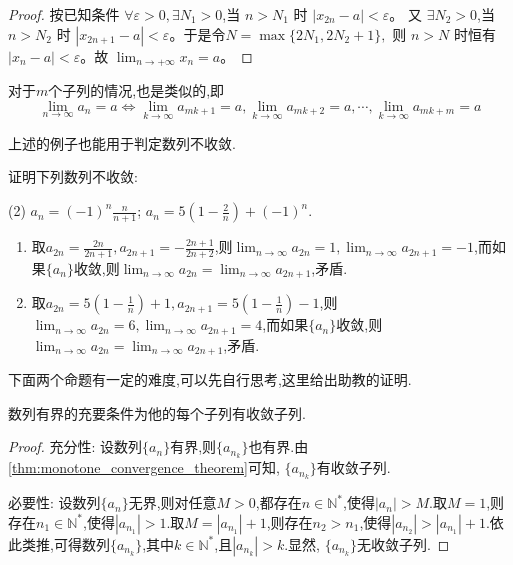 \begin{proof}
    按已知条件 \(\forall \varepsilon > 0, \exists N_1 > 0\),当 \(n > N_1\) 时 \(|x_{2n} - a| < \varepsilon\)。
    又 \(\exists N_2 > 0\),当 \(n > N_2\) 时 \(|x_{2n+1} - a| < \varepsilon\)。于是令\( N = \max\{2N_1, 2N_2 + 1\}, \)
    则 \(n > N\) 时恒有 \(|x_n - a| < \varepsilon\)。故 \(\lim_{n \to +\infty} x_n = a\)。

\end{proof}
对于$m$个子列的情况,也是类似的,即
\[\lim_{n\to\infty} a_n = a \Leftrightarrow \lim_{k\to\infty} a_{mk + 1} = a, \lim_{k\to\infty} a_{mk + 2} = a, \cdots, \lim_{k\to\infty} a_{mk + m} = a\]

上述的例子也能用于判定数列不收敛.

\begin{exercise}[1.2.7]
    证明下列数列不收敛:
    \begin{tasks}[label=(\arabic*)](2)
        \task $a_n = (-1)^n \frac{n}{n+1}$;
        \task $a_n = 5 \left(1 - \frac{2}{n}\right) + (-1)^n$.
    \end{tasks}
\end{exercise}

\begin{solution}
    \begin{enumerate}[(1)]
        \item 取$a_{2n} = \frac{2n}{2n+1}, a_{2n+1} = -\frac{2n+1}{2n+2}$,则$\lim_{n \to \infty} a_{2n} = 1, \lim_{n \to \infty} a_{2n+1} = -1$,而如果$\{a_n\}$收敛,则$\lim_{n \to \infty} a_{2n} = \lim_{n \to \infty} a_{2n+1}$,矛盾.
        \item 取$a_{2n} = 5 \left(1 - \frac{1}{n}\right)+1, a_{2n+1} = 5 \left(1 - \frac{1}{n}\right)-1$,则$\lim_{n \to \infty} a_{2n} = 6, \lim_{n \to \infty} a_{2n+1} = 4$,而如果$\{a_n\}$收敛,则$\lim_{n \to \infty} a_{2n} = \lim_{n \to \infty} a_{2n+1}$,矛盾.
    \end{enumerate}
\end{solution}

下面两个命题有一定的难度,可以先自行思考,这里给出助教的证明.

\begin{proposition}
    数列有界的充要条件为他的每个子列有收敛子列.
\end{proposition}

\begin{proof}
    充分性: 设数列$\{a_n\}$有界,则$\{a_{n_k}\}$也有界.由\autoref{thm:monotone_convergence_theorem}可知, $\{a_{n_k}\}$有收敛子列.

    必要性: 设数列$\{a_n\}$无界,则对任意$M > 0$,都存在$n \in \mathbb{N}^*$,使得$|a_n| > M$.取$M = 1$,则存在$n_1 \in \mathbb{N}^*$,使得$|a_{n_1}| > 1$.取$M = |a_{n_1}| + 1$,则存在$n_2 > n_1$,使得$|a_{n_2}| > |a_{n_1}| + 1$.依此类推,可得数列$\{a_{n_k}\}$,其中$k \in \mathbb{N}^*$,且$|a_{n_k}| > k$.显然, $\{a_{n_k}\}$无收敛子列.
\end{proof}

